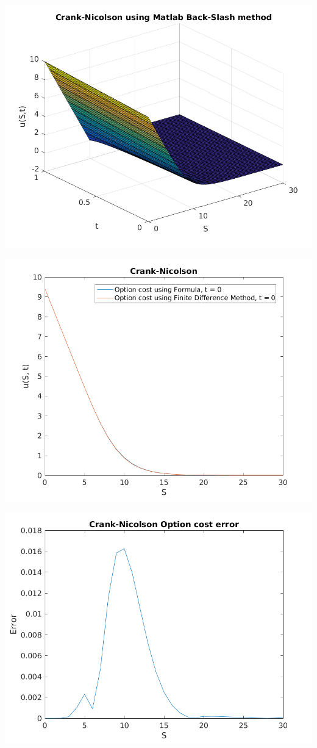 \documentclass{article}
\begin{document}
\includegraphics{"q2_22"}
\pagebreak


\includegraphics{"q2_23"}
\pagebreak


\includegraphics{"q2_24"}
\pagebreak
\end{document}
